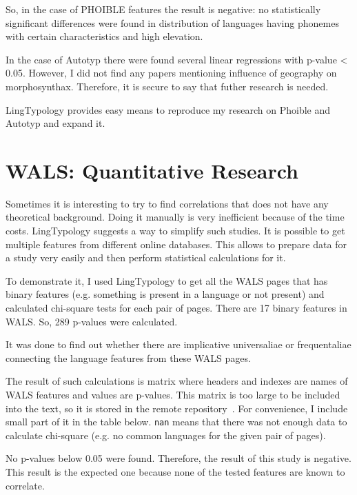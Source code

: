 \documentclass[a4paper,12pt]{article}
\begin{document}
So, in the case of PHOIBLE features the result is negative: no statistically significant differences were found in distribution of languages having phonemes with certain characteristics and high elevation.

In the case of Autotyp there were found several linear regressions with p-value < 0.05. However, I did not find any papers mentioning influence of geography on morphosynthax. Therefore, it is secure to say that futher research is needed.

LingTypology provides easy means to reproduce my research on Phoible and Autotyp and expand it.
\newpage

\section{WALS: Quantitative Research}

Sometimes it is interesting to try to find correlations that does not have any theoretical background. Doing it manually is very inefficient because of the time costs. LingTypology suggests a way to simplify such studies. It is possible to get multiple features from different online databases. This allows to prepare data for a study very easily and then perform statistical calculations for it.

To demonstrate it, I used LingTypology to get all the WALS pages that has binary features (e.g. something is present in a language or not present) and calculated chi-square tests for each pair of pages. There are 17 binary features in WALS. So, 289 p-values were calculated.

It was done to find out whether there are implicative universaliae or frequentaliae connecting the language features from these WALS pages.

The result of such calculations is matrix where headers and indexes are names of WALS features and values are p-values. This matrix is too large to be included into the text, so it is stored in the remote repository~\parencite[WALS: Quantitative Research.ipynb]{lingtypologyResearch}. For convenience, I include small part of it in the table below. \texttt{nan} means that there was not enough data to calculate chi-square (e.g. no common languages for the given pair of pages).

No p-values below 0.05 were found. Therefore, the result of this study is negative. This result is the expected one because none of the tested features are known to correlate.
\end{document}

